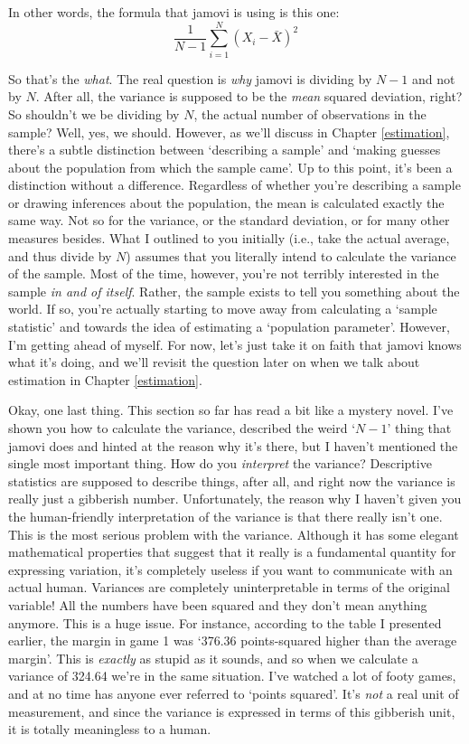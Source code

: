 \documentclass[
]{book}
\begin{document}
In other words, the formula that jamovi is using is this one:
\[
\frac{1}{N-1} \sum_{i=1}^N \left( X_i - \bar{X} \right)^2
\]

So that's the \emph{what}. The real question is \emph{why} jamovi is dividing by \(N-1\) and not by \(N\). After all, the variance is supposed to be the \emph{mean} squared deviation, right? So shouldn't we be dividing by \(N\), the actual number of observations in the sample? Well, yes, we should. However, as we'll discuss in Chapter \ref{estimation}, there's a subtle distinction between `describing a sample' and `making guesses about the population from which the sample came'. Up to this point, it's been a distinction without a difference. Regardless of whether you're describing a sample or drawing inferences about the population, the mean is calculated exactly the same way. Not so for the variance, or the standard deviation, or for many other measures besides. What I outlined to you initially (i.e., take the actual average, and thus divide by \(N\)) assumes that you literally intend to calculate the variance of the sample. Most of the time, however, you're not terribly interested in the sample \emph{in and of itself}. Rather, the sample exists to tell you something about the world. If so, you're actually starting to move away from calculating a `sample statistic' and towards the idea of estimating a `population parameter'. However, I'm getting ahead of myself. For now, let's just take it on faith that jamovi knows what it's doing, and we'll revisit the question later on when we talk about estimation in Chapter \ref{estimation}.

Okay, one last thing. This section so far has read a bit like a mystery novel. I've shown you how to calculate the variance, described the weird `\(N-1\)' thing that jamovi does and hinted at the reason why it's there, but I haven't mentioned the single most important thing. How do you \emph{interpret} the variance? Descriptive statistics are supposed to describe things, after all, and right now the variance is really just a gibberish number. Unfortunately, the reason why I haven't given you the human-friendly interpretation of the variance is that there really isn't one. This is the most serious problem with the variance. Although it has some elegant mathematical properties that suggest that it really is a fundamental quantity for expressing variation, it's completely useless if you want to communicate with an actual human. Variances are completely uninterpretable in terms of the original variable! All the numbers have been squared and they don't mean anything anymore. This is a huge issue. For instance, according to the table I presented earlier, the margin in game 1 was `376.36 points-squared higher than the average margin'. This is \emph{exactly} as stupid as it sounds, and so when we calculate a variance of 324.64 we're in the same situation. I've watched a lot of footy games, and at no time has anyone ever referred to `points squared'. It's \emph{not} a real unit of measurement, and since the variance is expressed in terms of this gibberish unit, it is totally meaningless to a human.
\end{document}
